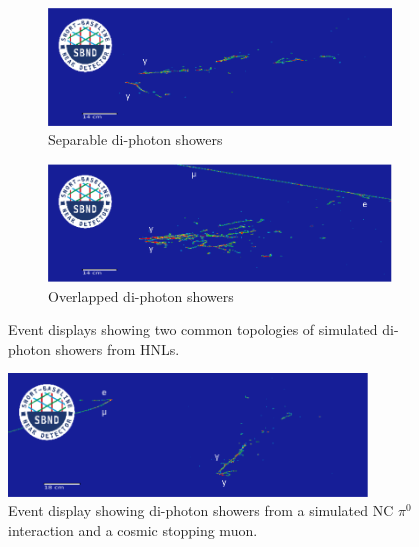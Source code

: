 \begin{figure}[ht!]
	\centering
        \begin{subfigure}[b]{0.85\textwidth}  
            \centering 
            \includegraphics[width=\textwidth]{hnl_2shw}
            \caption{Separable di-photon showers}%
	    \label{fig:hnl_evd_1shw}
        \end{subfigure}
        \centering
        \begin{subfigure}[b]{0.85\textwidth}   
            \centering 
            \includegraphics[width=\textwidth]{hnl_1shw}
            \caption{Overlapped di-photon showers}%
	    \label{fig:hnl_evd_2shw}
	\end{subfigure}
	\caption[Event Display of Di-Photon Showers From Heavy Neutral Leptons]{
	Event displays showing two common topologies of simulated di-photon showers from HNLs. 
	}
        \label{fig:hnl_evd_select}
\vspace{0.5cm}
	\centering
        \includegraphics[width=0.85\textwidth]{ncpi0}
        \caption[Event Display of a Neutral Current Interaction Containing a Neutral Pion]{
		Event display showing di-photon showers from a simulated NC $\pi^0$ interaction and a cosmic stopping muon. 
	}
	\label{fig:ncpi0_evd}
\end{figure}

